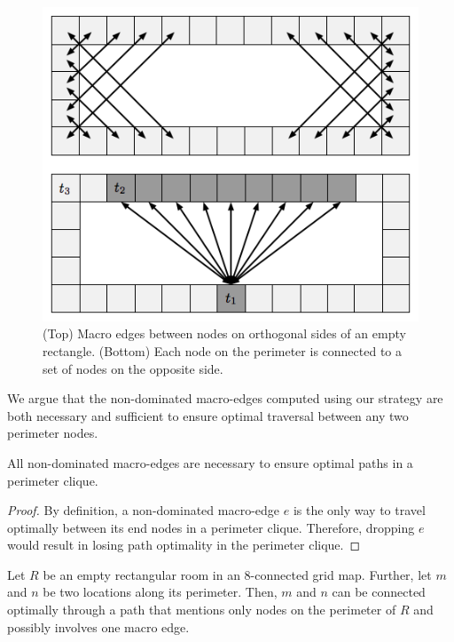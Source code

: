 \begin{figure}[tb]
       \begin{center}
                       \includegraphics[scale=0.45, trim = 10mm 10mm 10mm 0mm]{diagrams/macroedges.png}
       \end{center}
	\vspace{-3pt}
       \caption{(Top) Macro edges between nodes on orthogonal sides of an empty rectangle. 
(Bottom) Each node on the perimeter is connected to a set of nodes on the opposite side.}
       \label{fig-macroedges}
\end{figure}

We argue that the non-dominated macro-edges computed using our strategy are both necessary and sufficient
to ensure optimal traversal between any two perimeter nodes.

\begin{proposition}
All non-dominated macro-edges are necessary to ensure optimal paths in a perimeter clique.
\end{proposition}
\begin{proof}
By definition, a non-dominated macro-edge $e$ is the only way to travel optimally between 
its end nodes in a perimeter clique. Therefore, dropping $e$ would result in losing path optimality
in the perimeter clique.
\end{proof}

\begin{lemma}
\label{lemma-rooms}
Let $R$ be an empty rectangular room in an 8-connected grid map.
Further, let $m$ and $n$ be two locations along its perimeter.
Then, $m$ and $n$ can be connected optimally through a path that mentions only nodes on the perimeter of $R$ and
possibly involves one macro edge.
\end{lemma}

